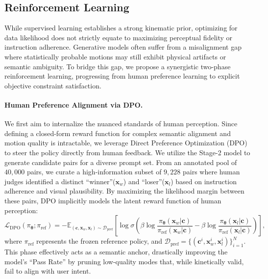 \subsection{Reinforcement Learning}
\label{subsec:stage3}

While supervised learning establishes a strong kinematic prior, optimizing for data likelihood does not strictly equate to maximizing perceptual fidelity or instruction adherence.
Generative models often suffer from a misalignment gap where statistically probable motions may still exhibit physical artifacts or semantic ambiguity.
To bridge this gap, we propose a synergistic two-phase reinforcement learning, progressing from human preference learning to explicit objective constraint satisfaction.

\paragraph{Human Preference Alignment via DPO.}
We first aim to internalize the nuanced standards of human perception.
Since defining a closed-form reward function for complex semantic alignment and motion quality is intractable, we leverage Direct Preference Optimization (DPO)~\citep{Rafailov2023} to steer the policy directly from human feedback.
We utilize the Stage-2 model to generate candidate pairs for a diverse prompt set.
From an annotated pool of $40,000$ pairs, we curate a high-information subset of $9,228$ pairs where human judges identified a distinct ``winner''($\bm{x}_w$) and ``loser''($\bm{x}_l$) based on instruction adherence and visual plausibility.
By maximizing the likelihood margin between these pairs, DPO implicitly models the latent reward function of human perception:
\begin{equation}
    \mathcal{L}_{\text{DPO}}(\pi_{\bm{\theta}};\pi_{\text{ref}}) = - \mathbb{E}_{(\bm{c}, \bm{x}_w, \bm{x}_l) \sim \mathcal{D}_{\text{pref}}} \left[ \log \sigma \left( \beta \log \frac{\pi_{\bm{\theta}}(\bm{x}_w|\bm{c})}{\pi_{\text{ref}}(\bm{x}_w|\bm{c})} - \beta \log \frac{\pi_{\bm{\theta}}(\bm{x}_l|\bm{c})}{\pi_{\text{ref}}(\bm{x}_l|\bm{c})} \right) \right],
\end{equation}
where $\pi_{\text{ref}}$ represents the frozen reference policy, and $\mathcal{D}_{\text{pref}}=\{(\bm{c}^i, \bm{x}_w^i, \bm{x}_l^i)\}_{i=1}^N$.
This phase effectively acts as a semantic anchor, drastically improving the model's ``Pass Rate'' by pruning low-quality modes that, while kinetically valid, fail to align with user intent.

